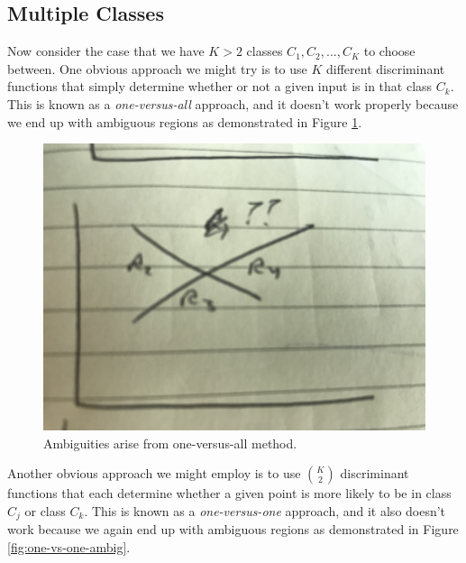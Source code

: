 
\subsection{Multiple Classes}
Now consider the case that we have $K > 2$ classes $C_{1}, C_{2}, ..., C_{K}$ to choose between. One obvious approach we might try is to use $K$ different discriminant functions that simply determine whether or not a given input is in that class $C_{k}$. This is known as a \textit{one-versus-all} approach, and it doesn't work properly because we end up with ambiguous regions as demonstrated in Figure \ref{fig:one-vs-all-ambig}.

\begin{figure}
    \centering
    \includegraphics[width=0.5\paperwidth]{../Classification/fig/one_vs_all_ambig.jpg}
    \caption{Ambiguities arise from one-versus-all method.}
    \label{fig:one-vs-all-ambig}
\end{figure}

Another obvious approach we might employ is to use $\binom{K}{2}$ discriminant functions that each determine whether a given point is more likely to be in class $C_{j}$ or class $C_{k}$. This is known as a \textit{one-versus-one} approach, and it also doesn't work because we again end up with ambiguous regions as demonstrated in Figure \ref{fig:one-vs-one-ambig}.

